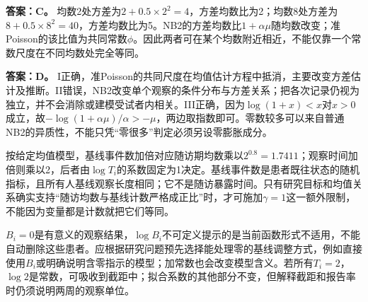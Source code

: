 \textbf{答案：C。} 均数2处方差为$2+0.5\times2^2=4$，方差均数比为2；均数8处方差为$8+0.5\times8^2=40$，方差均数比为5。NB2的方差均数比$1+\alpha\mu$随均数改变；准Poisson的该比值为共同常数$\phi$。因此两者可在某个均数附近相近，不能仅靠一个常数尺度在不同均数处完全等同。
\par\nobreak\smallskip{}

\textbf{答案：D。} I正确，准Poisson的共同尺度在均值估计方程中抵消，主要改变方差估计及推断。II错误，NB2改变单个观察的条件分布与方差关系；把各次记录仍视为独立，并不会消除或建模受试者内相关。III正确，因为$\log(1+x)<x$对$x>0$成立，故$-\log(1+\alpha\mu)/\alpha>-\mu$，两边取指数即可。零数较多可以来自普通NB2的异质性，不能只凭“零很多”判定必须另设零膨胀成分。
\par\nobreak\smallskip{}

按给定均值模型，基线事件数加倍对应随访期均数乘以$2^{0.8}=1.7411$；观察时间加倍则乘以2，后者由$\log T_i$的系数固定为1决定。基线事件数是患者既往状态的随机指标，且所有人基线观察长度相同；它不是随访暴露时间。只有研究目标和均值关系确实支持“随访均数与基线计数严格成正比”时，才可施加$\gamma=1$这一额外限制，不能因为变量都是计数就把它们等同。\par $B_i=0$是有意义的观察结果，$\log B_i$不可定义提示的是当前函数形式不适用，不能自动删除这些患者。应根据研究问题预先选择能处理零的基线调整方式，例如直接使用$B_i$或明确说明含零指示的模型；加常数也会改变模型含义。若所有$T_i=2$，$\log2$是常数，可吸收到截距中；拟合系数的其他部分不变，但解释截距和报告率时仍须说明两周的观察单位。
\par\nobreak\smallskip{}

